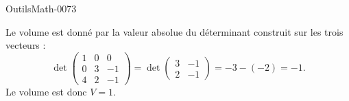 
\begin{corrige}{OutilsMath-0073}

    Le volume est donné par la valeur absolue du déterminant construit sur les trois vecteurs :
    \begin{equation}
        \det\begin{pmatrix}
            1    &   0    &   0    \\
            0    &   3    &   -1    \\
            4    &   2    &   -1
        \end{pmatrix}=\det\begin{pmatrix}
            3    &   -1    \\ 
            2    &   -1    
        \end{pmatrix}=-3-(-2)=-1.
    \end{equation}
    Le volume est donc $V=1$.

\end{corrige}
